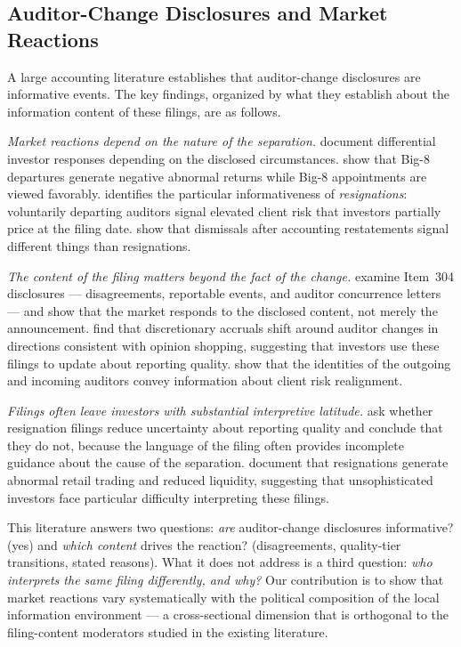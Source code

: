 \documentclass[12pt]{article}
\begin{document}
\subsection{Auditor-Change Disclosures and Market Reactions}

A large accounting literature establishes that auditor-change disclosures
are informative events. The key findings, organized by what they establish
about the information content of these filings, are as follows.

\emph{Market reactions depend on the nature of the separation.}
\citet{dodd1984} document differential investor responses depending on
the disclosed circumstances. \citet{johnson1990} show that Big-8 departures
generate negative abnormal returns while Big-8 appointments are viewed
favorably. \citet{shu2000} identifies the particular informativeness of
\emph{resignations}: voluntarily departing auditors signal elevated client
risk that investors partially price at the filing date. \citet{hennes2014}
show that dismissals after accounting restatements signal different things
than resignations.

\emph{The content of the filing matters beyond the fact of the change.}
\citet{whisenant2003} examine Item~304 disclosures --- disagreements,
reportable events, and auditor concurrence letters --- and show that the
market responds to the disclosed content, not merely the announcement.
\citet{defond1998} find that discretionary accruals shift around auditor
changes in directions consistent with opinion shopping, suggesting that
investors use these filings to update about reporting quality.
\citet{landsman2009} show that the identities of the outgoing and incoming
auditors convey information about client risk realignment.

\emph{Filings often leave investors with substantial interpretive latitude.}
\citet{beneish2005} ask whether resignation filings reduce uncertainty
about reporting quality and conclude that they do not, because the
language of the filing often provides incomplete guidance about the
cause of the separation. \citet{boone2001} document that resignations
generate abnormal retail trading and reduced liquidity, suggesting that
unsophisticated investors face particular difficulty interpreting these
filings.

This literature answers two questions: \emph{are} auditor-change
disclosures informative? (yes) and \emph{which content} drives the
reaction? (disagreements, quality-tier transitions, stated reasons).
What it does not address is a third question: \emph{who interprets the
same filing differently, and why?} Our contribution is to show that
market reactions vary systematically with the political composition of
the local information environment --- a cross-sectional dimension that
is orthogonal to the filing-content moderators studied in the existing
literature.
\end{document}
